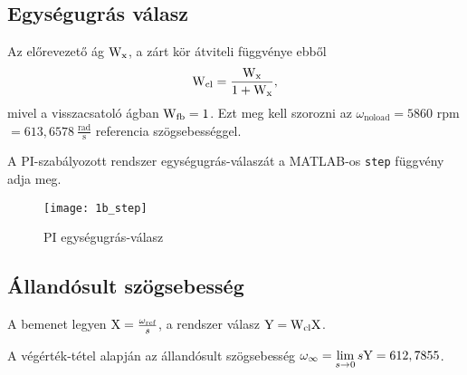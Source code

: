 
\subsection{Egységugrás válasz}

Az előrevezető ág $\mathrm{W}_\text{x}$, a zárt kör átviteli függvénye ebből
\begin{equation}
	\mathrm{W}_\text{cl} = \frac{\mathrm{W}_\text{x}}{1+\mathrm{W}_\text{x}},
\end{equation}
mivel a visszacsatoló ágban $\mathrm{W}_\text{fb}=1$.
Ezt meg kell szorozni az $\omega_\text{noload} = 5860$ rpm $ = 613,6578~\frac{\text{rad}}{\text{s}} $ referencia szögsebességgel.

A PI-szabályozott rendszer egységugrás-válaszát a MATLAB-os \verb|step| függvény adja meg.
\begin{figure}[H]
	\centering
	\texttt{[image: 1b\_step]}
	\caption{PI egységugrás-válasz}
	\label{fig:1b_step}
\end{figure}


\subsection{Állandósult szögsebesség}

A bemenet legyen $\mathrm{X} = \frac{\omega_\text{ref}}{s}$, a rendszer válasz $\mathrm{Y} = \mathrm{W}_\text{cl}\mathrm{X}$.

A végérték-tétel alapján az állandósult szögsebesség $\omega_\infty = \lim\limits_{s\rightarrow 0}s\mathrm{Y} = 612,7855$.

